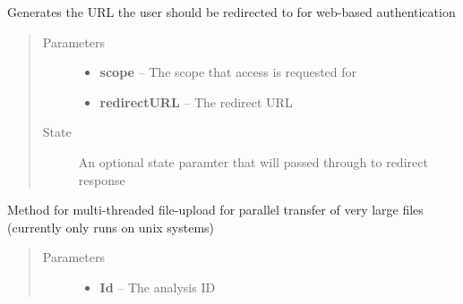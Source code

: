 \documentclass[letterpaper,10pt,english]{sphinxmanual}
\begin{document}
\begin{fulllineitems}
\begin{fulllineitems}
\begin{quote}
\begin{description}
\end{description}\end{quote}

\end{fulllineitems}


\begin{fulllineitems}
\label{Available modules:BaseSpacePy.api.BaseSpaceAPI.BaseSpaceAPI.getWebVerificationCode}
Generates the URL the user should be redirected to for web-based authentication
\begin{quote}\begin{description}
\item[{Parameters}] \leavevmode\begin{itemize}
\item {} 
\textbf{scope} -- The scope that access is requested for

\item {} 
\textbf{redirectURL} -- The redirect URL

\end{itemize}

\item[{State }] \leavevmode
An optional state paramter that will passed through to redirect response

\end{description}\end{quote}

\end{fulllineitems}


\begin{fulllineitems}
\label{Available modules:BaseSpacePy.api.BaseSpaceAPI.BaseSpaceAPI.multipartFileUpload}
Method for multi-threaded file-upload for parallel transfer of very large files (currently only runs on unix systems)
\begin{quote}\begin{description}
\item[{Parameters}] \leavevmode\begin{itemize}
\item {} 
\textbf{Id} -- The analysis ID


\end{itemize}
\end{description}
\end{quote}
\end{fulllineitems}
\end{fulllineitems}
\end{document}
